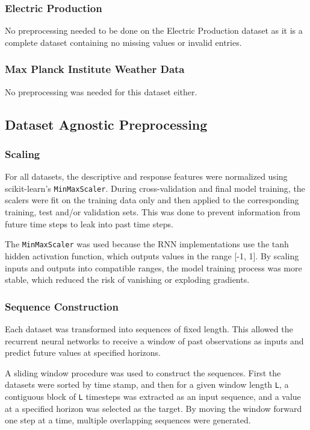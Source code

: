 \documentclass[conference]{IEEEtran}
\begin{document}
\subsubsection{\textbf{Electric Production}}
No preprocessing needed to be done on the Electric Production dataset as it is a complete dataset containing no missing values or invalid entries.

\subsubsection{\textbf{Max Planck Institute Weather Data}}
No preprocessing was needed for this dataset either.

\subsection{\textbf{Dataset Agnostic Preprocessing}}
\subsubsection{\textbf{Scaling}}
For all datasets, the descriptive and response features were normalized using scikit-learn's \texttt{MinMaxScaler}. During cross-validation and final model training, the scalers were fit on the training data only and then applied to the corresponding training, test and/or validation sets. This was done to prevent information from future time steps to leak into past time steps.

The \texttt{MinMaxScaler} was used because the RNN implementations use the tanh hidden activation function, which outputs values in the range [-1, 1]. By scaling inputs and outputs into compatible ranges, the model training process was more stable, which reduced the risk of vanishing or exploding gradients.

\subsubsection{\textbf{Sequence Construction}}
Each dataset was transformed into sequences of fixed length. This allowed the recurrent neural networks to receive a window of past observations as inputs and predict future values at specified horizons.

A sliding window procedure was used to construct the sequences. First the datasets were sorted by time stamp, and then for a given window length \texttt{L}, a contiguous block of \texttt{L} timesteps was extracted as an input sequence, and a value at a specified horizon was selected as the target. By moving the window forward one step at a time, multiple overlapping sequences were generated.
\end{document}
